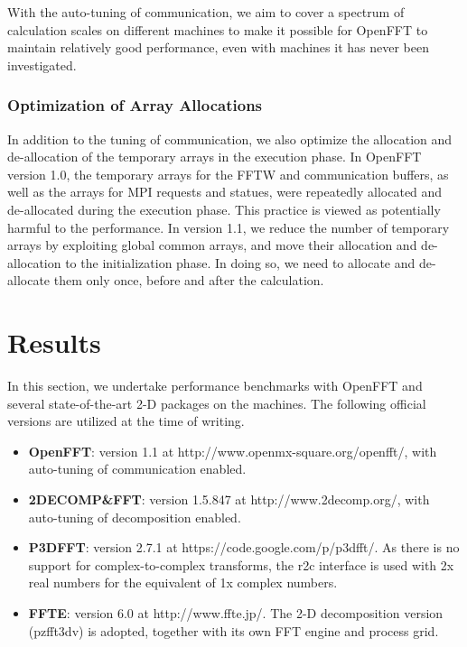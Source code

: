 With the auto-tuning of communication, we aim to cover a spectrum of calculation scales on different machines to make it possible for OpenFFT to maintain relatively good performance, even with machines it has never been investigated.   


\subsubsection{Optimization of Array Allocations}

In addition to the tuning of communication, we also optimize the allocation and de-allocation of the temporary arrays in the execution phase. In OpenFFT version 1.0, the temporary arrays for the FFTW and communication buffers, as well as the arrays for MPI requests and statues, were repeatedly allocated and de-allocated during the execution phase. This practice is viewed as potentially harmful to the performance. In version 1.1, we reduce the number of temporary arrays by exploiting global common arrays, and move their allocation and de-allocation to the initialization phase. In doing so, we need to allocate and de-allocate them only once, before and after the calculation.  

\section{Results}
In this section, we undertake performance benchmarks with OpenFFT and several state-of-the-art 2-D packages on the machines. The following official versions are utilized at the time of writing.
\begin{itemize}
\item
\textbf{OpenFFT}: version 1.1 at http://www.openmx-square.org/openfft/, with auto-tuning of communication enabled. 
\item
\textbf{2DECOMP\&FFT}: version 1.5.847 at http://www.2decomp.org/, with auto-tuning of decomposition enabled. 
\item
\textbf{P3DFFT}: version 2.7.1 at https://code.google.com/p/p3dfft/. As there is no support for complex-to-complex transforms, the r2c interface is used with 2x real numbers for the equivalent of 1x complex numbers. 
\item
\textbf{FFTE}: version 6.0 at http://www.ffte.jp/. The 2-D decomposition version (pzfft3dv) is adopted, together with its own FFT engine and process grid. 

\end{itemize}

